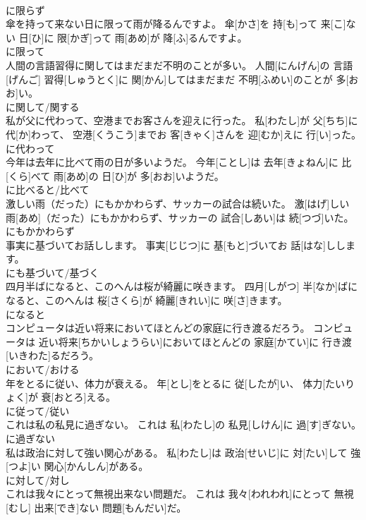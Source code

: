 \documentclass[8pt]{extreport}
\begin{document}
\begin{CJK}{UTF8}{min}
\\	に限らず	
\\	傘を持って来ない日に限って雨が降るんですよ。	傘[かさ]を 持[も]って 来[こ]ない 日[ひ]に 限[かぎ]って 雨[あめ]が 降[ふ]るんですよ。	
\\	に限って	
\\	人間の言語習得に関してはまだまだ不明のことが多い。	人間[にんげん]の 言語[げんご] 習得[しゅうとく]に 関[かん]してはまだまだ 不明[ふめい]のことが 多[おお]い。	
\\	に関して/関する	
\\	私が父に代わって、空港までお客さんを迎えに行った。	私[わたし]が 父[ちち]に 代[か]わって、 空港[くうこう]までお 客[きゃく]さんを 迎[むか]えに 行[い]った。	
\\	に代わって	
\\	今年は去年に比べて雨の日が多いようだ。	今年[ことし]は 去年[きょねん]に 比[くら]べて 雨[あめ]の 日[ひ]が 多[おお]いようだ。	
\\	に比べると/比べて	
\\	激しい雨（だった）にもかかわらず、サッカーの試合は続いた。	激[はげ]しい 雨[あめ]（だった）にもかかわらず、サッカーの 試合[しあい]は 続[つづ]いた。	
\\	にもかかわらず	
\\	事実に基づいてお話しします。	事実[じじつ]に 基[もと]づいてお 話[はな]しします。	
\\	にも基づいて/基づく	
\\	四月半ばになると、このへんは桜が綺麗に咲きます。	四月[しがつ] 半[なか]ばになると、このへんは 桜[さくら]が 綺麗[きれい]に 咲[さ]きます。	
\\	になると	
\\	コンピュータは近い将来においてほとんどの家庭に行き渡るだろう。	コンピュータは 近い将来[ちかいしょうらい]においてほとんどの 家庭[かてい]に 行き渡[いきわた]るだろう。	
\\	において/おける	
\\	年をとるに従い、体力が衰える。	年[とし]をとるに 従[したが]い、 体力[たいりょく]が 衰[おとろ]える。	
\\	に従って/従い	
\\	これは私の私見に過ぎない。	これは 私[わたし]の 私見[しけん]に 過[す]ぎない。	
\\	に過ぎない	
\\	私は政治に対して強い関心がある。	私[わたし]は 政治[せいじ]に 対[たい]して 強[つよ]い 関心[かんしん]がある。	
\\	に対して/対し	
\\	これは我々にとって無視出来ない問題だ。	これは 我々[われわれ]にとって 無視[むし] 出来[でき]ない 問題[もんだい]だ。	

\end{CJK}
\end{document}
